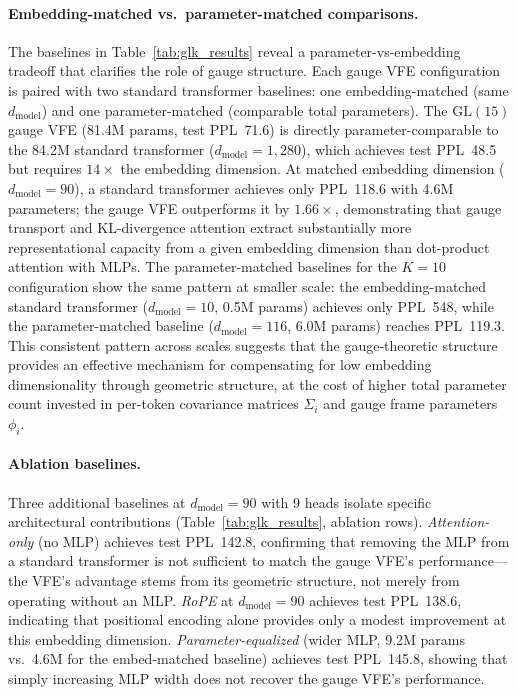 \documentclass[twoside,11pt]{article}
\begin{document}
\paragraph{Embedding-matched vs.\ parameter-matched comparisons.}
The baselines in Table~\ref{tab:glk_results} reveal a parameter-vs-embedding tradeoff that clarifies the role of gauge structure. Each gauge VFE configuration is paired with two standard transformer baselines: one embedding-matched (same $d_{\text{model}}$) and one parameter-matched (comparable total parameters). The $\mathrm{GL}(15)$ gauge VFE (81.4M params, test PPL~71.6) is directly parameter-comparable to the 84.2M standard transformer ($d_{\text{model}} = 1{,}280$), which achieves test PPL~48.5 but requires $14\times$ the embedding dimension. At matched embedding dimension ($d_{\text{model}} = 90$), a standard transformer achieves only PPL~118.6 with 4.6M parameters; the gauge VFE outperforms it by $1.66\times$, demonstrating that gauge transport and KL-divergence attention extract substantially more representational capacity from a given embedding dimension than dot-product attention with MLPs. The parameter-matched baselines for the $K = 10$ configuration show the same pattern at smaller scale: the embedding-matched standard transformer ($d_{\text{model}} = 10$, 0.5M params) achieves only PPL~548, while the parameter-matched baseline ($d_{\text{model}} = 116$, 6.0M params) reaches PPL~119.3. This consistent pattern across scales suggests that the gauge-theoretic structure provides an effective mechanism for compensating for low embedding dimensionality through geometric structure, at the cost of higher total parameter count invested in per-token covariance matrices $\Sigma_i$ and gauge frame parameters $\phi_i$.

\paragraph{Ablation baselines.}
Three additional baselines at $d_{\text{model}} = 90$ with 9 heads isolate specific architectural contributions (Table~\ref{tab:glk_results}, ablation rows). \emph{Attention-only} (no MLP) achieves test PPL~142.8, confirming that removing the MLP from a standard transformer is not sufficient to match the gauge VFE's performance---the VFE's advantage stems from its geometric structure, not merely from operating without an MLP. \emph{RoPE} at $d_{\text{model}} = 90$ achieves test PPL~138.6, indicating that positional encoding alone provides only a modest improvement at this embedding dimension. \emph{Parameter-equalized} (wider MLP, 9.2M params vs.\ 4.6M for the embed-matched baseline) achieves test PPL~145.8, showing that simply increasing MLP width does not recover the gauge VFE's performance.
\end{document}
